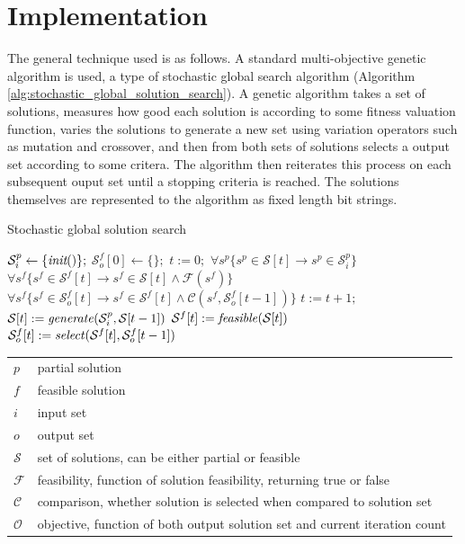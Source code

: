 \section{Implementation}
The general technique used is as follows.  A standard  multi-objective genetic algorithm is used, a type of stochastic global search algorithm (Algorithm \ref{alg:stochastic_global_solution_search}).  A genetic algorithm takes a set of solutions, measures how good each solution is according to some fitness valuation function, varies the solutions to generate a new set using variation operators such as mutation and crossover, and then from both sets of solutions selects a output set according to some critera.  The algorithm then reiterates this process on each subsequent ouput set until a stopping criteria is reached.  The solutions themselves are represented to the algorithm as fixed length bit strings.  

\begin{algorithm}
  \caption{Stochastic global solution search}
  \label{alg:stochastic_global_solution_search}
  \begin{algorithmic}
    \STATE $\mathcal{S}^p_i \leftarrow \{\emph{init}()\};$
    \STATE $\mathcal{S}^f_o[0] \leftarrow \{\};$
    \STATE $t := 0;$
    \ENSURE $\forall s^p \{s^p \in \mathcal{S}[t] \rightarrow s^p \in \mathcal{S}^p_i\}$
    \ENSURE $\forall s^f \{s^f \in \mathcal{S}^f[t] \rightarrow s^f \in \mathcal{S}[t] \wedge \mathcal{F}(s^f)\}$
    \ENSURE $\forall s^f \{s^f \in \mathcal{S}^f_o[t] \rightarrow s^f \in \mathcal{S}^f[t] \wedge \mathcal{C}(s^f, \mathcal{S}^f_o[t - 1])\}$
    \STATE $t := t + 1;$
    \STATE $\mathcal{S}[t] := \mbox{\emph{generate}}(\mathcal{S}^p_i,\mathcal{S}[t-1])$
    \STATE $\mathcal{S}^f[t] := \mbox{\emph{feasible}}(\mathcal{S}[t])$
    \STATE $\mathcal{S}^f_o[t] := \mbox{\emph{select}}(\mathcal{S}^f[t], \mathcal{S}^f_o[t-1])$
    \ENDWHILE
  \end{algorithmic}
  \begin{tabular}{|l|l|}
  \hline
    $p$ & partial solution \\
    $f$ & feasible solution \\
    $i$ & input set \\
    $o$ & output set \\
    $\mathcal{S}$ & set of solutions, can be either partial or feasible \\
    $\mathcal{F}$ & feasibility, function of solution feasibility, returning true or false \\
    $\mathcal{C}$ & comparison, whether solution is selected when compared to solution set \\
    $\mathcal{O}$ & objective, function of both output solution set and current iteration count \\
  \hline
  \end{tabular}
\end{algorithm}

